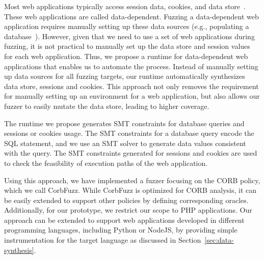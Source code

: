 \documentclass[10pt,conference]{IEEEtran}
\begin{document}

Most web applications typically access session data, cookies, and data store~\cite{web_two_decades}. These web applications are called data-dependent. Fuzzing a data-dependent web application requires manually setting up these data sources (e.g., populating a database~\cite{alshahwan2011automated,biagiola2017search}). However, given that we need to use a set of web applications during fuzzing, it is not practical to manually set up the data store and session values for each web application. Thus, we propose a runtime for data-dependent web applications that enables us to automate the process.  
Instead of manually setting up data sources for all fuzzing targets, our runtime automatically synthesizes data store, sessions and cookies. This approach not only removes the requirement for manually setting up an environment for a web application, but also allows our fuzzer to easily mutate the data store, leading to higher coverage.

The runtime we propose generates SMT constraints for database queries and sessions or cookies usage. The SMT constraints for a database query encode the SQL statement, and we use an SMT solver to generate data values consistent with the query. The SMT constraints generated for sessions and cookies are used to check the feasibility of execution paths of the web application.

Using this approach, we have implemented a fuzzer focusing on the CORB policy, which we call CorbFuzz. While CorbFuzz is optimized for CORB analysis, it can be easily extended to support other policies by defining corresponding oracles. Additionally, for our prototype, we restrict our scope to PHP applications. Our approach can be extended to support {web applications developed in different programming languages, including Python or NodeJS,} by providing simple instrumentation for the target language as discussed in Section~\ref{sec:data-synthesis}. 
\end{document}
